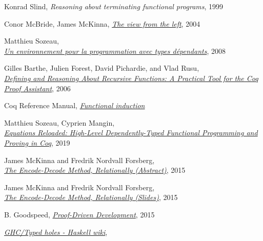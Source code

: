 \documentclass[declaration,mgr,english,shortabstract]{iithesis}
\begin{document}
\begin{thebibliography}{1}
    Konrad Slind,
    \textit{Reasoning about terminating functional programs},
    1999

    Conor McBride, James McKinna,
    \href{https://www.researchgate.net/publication/220676549_The_view_from_the_left}{\textit{The view from the left}},
    2004

    Matthieu Sozeau, \\
    \href{https://www.irif.fr/~sozeau/research/publications/thesis-sozeau.pdf}{\textit{Un environnement pour la programmation avec types d\'{e}pendants}},
    2008

    Gilles Barthe, Julien Forest, David Pichardie, and Vlad Rusu, \\
    \href{https://www.researchgate.net/publication/48415012_Defining_and_Reasoning_About_Recursive_Functions_A_Practical_Tool_for_the_Coq_Proof_Assistant}{\textit{Defining and Reasoning About Recursive Functions: A Practical Tool for the Coq Proof Assistant}},
    2006

    Coq Reference Manual,
    \href{https://coq.inria.fr/refman/using/libraries/funind.html}{\textit{Functional induction}}

    Matthieu Sozeau, Cyprien Mangin, \\
    \href{https://www.irif.fr/~sozeau//research/publications/Equations_Reloaded-ICFP19.pdf}{\textit{Equations Reloaded: High-Level Dependently-Typed Functional Programming and Proving in Coq}},
    2019

    James McKinna and Fredrik Nordvall Forsberg, \\
    \href{http://cs.ioc.ee/types15/abstracts-book/contrib27.pdf}{\textit{The Encode-Decode Method, Relationally (Abstract)}},
    2015

    James McKinna and Fredrik Nordvall Forsberg, \\
    \href{https://personal.cis.strath.ac.uk/fredrik.nordvall-forsberg/talks/stp_dundee_2015/stp_dundee_2015-10-07.pdf}{\textit{The Encode-Decode Method, Relationally (Slides)}},
    2015

    B. Goodspeed,
    \href{https://arxiv.org/pdf/1512.02102.pdf}{\textit{Proof-Driven Development}}, 2015

    \href{https://wiki.haskell.org/GHC/Typed_holes}{\textit{GHC/Typed holes - Haskell wiki}}, \\


\end{thebibliography}
\end{document}
